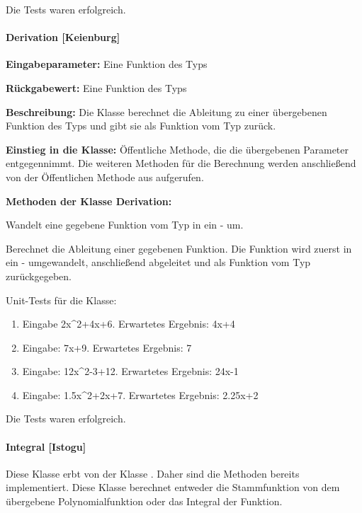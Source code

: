 Die Tests waren erfolgreich.

\paragraph{Derivation [Keienburg]}

\textbf{Eingabeparameter: }Eine Funktion des Typs 

\textbf{Rückgabewert:} Eine Funktion des Typs 

\textbf{Beschreibung:} Die Klasse berechnet die Ableitung zu einer übergebenen Funktion des Typs  und gibt sie als Funktion vom Typ  zurück. 

\textbf{Einstieg in die Klasse: }Öffentliche Methode, die die übergebenen Parameter entgegennimmt. Die weiteren Methoden für die Berechnung werden anschließend von der Öffentlichen Methode aus aufgerufen. 

\textbf{Methoden der Klasse Derivation: }

 Wandelt eine gegebene Funktion vom Typ  in ein - um. 

Berechnet die Ableitung einer gegebenen Funktion. Die Funktion wird zuerst in ein - umgewandelt, anschließend abgeleitet und als Funktion vom Typ  zurückgegeben. 

Unit-Tests für die Klasse: 

\begin{enumerate}
\item Eingabe 2x\^{}2+4x+6. Erwartetes Ergebnis: 4x+4
\item Eingabe: 7x+9. Erwartetes Ergebnis: 7
\item Eingabe: 12x\^{}2-3+12. Erwartetes Ergebnis: 24x-1
\item Eingabe: 1.5x\^{}2+2x+7. Erwartetes Ergebnis: 2.25x+2
\end{enumerate}  

Die Tests waren erfolgreich.

\paragraph{Integral [Istogu]}

Diese Klasse erbt von der Klasse . Daher sind die Methoden bereits implementiert. Diese Klasse berechnet entweder die Stammfunktion von dem übergebene Polynomialfunktion oder das Integral der Funktion. 

